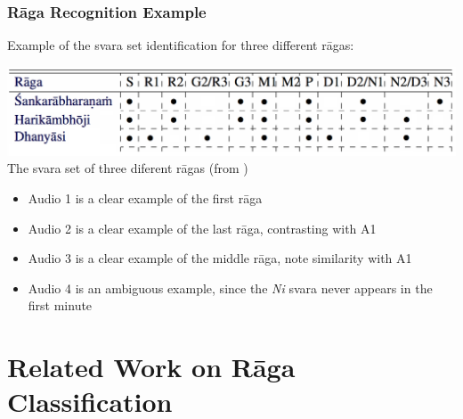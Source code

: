 \documentclass[hyperref={pdfpagelabels=false}]{beamer}
\begin{document}
     \begin{frame}
       \frametitle{R\=aga Recognition Example}
       Example of the svara set identification for three different r\=agas:
       \begin{center}
         \includegraphics[scale=0.25]{svaras_example.png}
         \\{\scriptsize The svara set of three diferent r\=agas (from \cite[p.244]{gulati})}
       \end{center}

       \begin{itemize}
       \item Audio 1 is a clear example of the first r\=aga
         
       \item Audio 2 is a clear example of the last r\=aga, contrasting with A1
       \item Audio 3 is a clear example of the middle r\=aga, note similarity with A1
       \item Audio 4 is an ambiguous example, since the {\it Ni} svara never appears in the first minute
       \end{itemize}
     \end{frame}



     \section{Related Work on R\=aga Classification}
     \frame{\sectionpage}
\end{document}
